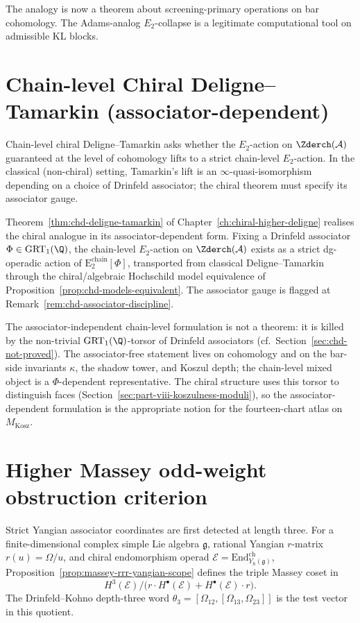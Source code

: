 The analogy is now a theorem about screening-primary operations on bar
cohomology. The Adams-analog $E_{2}$-collapse is a legitimate
computational tool on admissible KL blocks.

\section{Chain-level Chiral Deligne--Tamarkin (associator-dependent)}
\label{sec:part-viii-deligne-tamarkin}

Chain-level chiral Deligne--Tamarkin asks whether the $E_{2}$-action
on $\Zderch(\mathcal{A})$ guaranteed at the level of cohomology lifts
to a strict chain-level $E_{2}$-action. In the classical (non-chiral)
setting, Tamarkin's lift is an $\infty$-quasi-isomorphism depending on
a choice of Drinfeld associator; the chiral theorem must specify its
associator gauge.

Theorem~\ref{thm:chd-deligne-tamarkin} of
Chapter~\ref{ch:chiral-higher-deligne} realises the chiral analogue
in its associator-dependent form. Fixing a Drinfeld associator
$\Phi \in \mathrm{GRT}_{1}(\Q)$, the chain-level $E_{2}$-action on
$\Zderch(\mathcal{A})$ exists as a strict dg-operadic action of
$\mathrm{E}_{2}^{\mathrm{chain}}[\Phi]$, transported from classical
Deligne--Tamarkin through the chiral/algebraic Hochschild model
equivalence of Proposition~\ref{prop:chd-models-equivalent}.
The associator gauge is flagged at
Remark~\ref{rem:chd-associator-discipline}.

The associator-independent chain-level formulation is not a theorem:
it is killed by the non-trivial
$\mathrm{GRT}_{1}(\Q)$-torsor of Drinfeld associators
(cf.\ Section~\ref{sec:chd-not-proved}).  The
associator-free statement lives on cohomology and on the bar-side
invariants \(\kappa\), the shadow tower, and Koszul depth; the
chain-level mixed object is a \(\Phi\)-dependent representative. The
chiral structure uses this torsor to distinguish faces
(Section~\ref{sec:part-viii-koszulness-moduli}), so the
associator-dependent formulation is the appropriate notion for the
fourteen-chart atlas on $M_{\mathrm{Kosz}}$.

\section{Higher Massey odd-weight obstruction criterion}
\label{sec:part-viii-massey}

Strict Yangian associator coordinates are first detected at length
three. For a finite-dimensional complex simple Lie algebra
$\mathfrak g$, rational Yangian $r$-matrix \(r(u)=\Omega/u\), and
chiral endomorphism operad
\(\mathcal E=\mathrm{End}^{\mathrm{ch}}_{Y_\hbar(\mathfrak g)}\),
Proposition~\ref{prop:massey-rrr-yangian-scope} defines the triple
Massey coset in
\[
H^3(\mathcal E)\Big/
\bigl(r\cdot H^\bullet(\mathcal E)+H^\bullet(\mathcal E)\cdot r\bigr).
\]
The Drinfeld--Kohno depth-three word
\(\theta_3=[\Omega_{12},[\Omega_{13},\Omega_{23}]]\) is the test
vector in this quotient.

